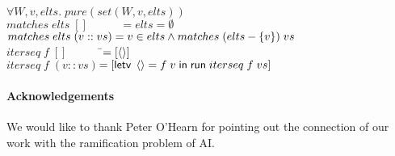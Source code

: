 \begin{tabbing}
$\forall W, v, elts.\; pure(set(W,v,elts))$ \\[1em]
  

$matches\;elts\;[] \qquad\;\;\; = elts = \emptyset$ \\
$matches\;elts\;(v :: vs) = v \in elts \land matches\;(elts - \{{v}\})\;vs$\\[1em]

$iterseq\; f\; [] \qquad\;\;\;\;$\=$= [\left<\right>]$ \\
$iterseq\; f\; (v :: vs)$\>$= [\mathsf{letv}\;\left<\right> = f\;v\;\mathsf{in}\;\mathsf{run}\;iterseq\;f\;vs]$ \\
\end{tabbing}


\paragraph{Acknowledgements}

We would like to thank Peter O'Hearn for pointing out the connection
of our work with the ramification problem of AI.


